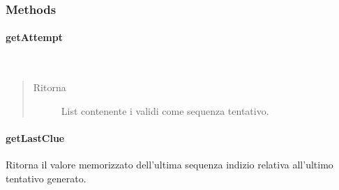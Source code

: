 \documentclass[letterpaper,10pt,italian,openany,oneside]{sphinxmanual}
\begin{document}
\subsubsection{Methods}
\label{\detokenize{source/it/unicam/cs/pa/mastermind/players/CodeBreaker:methods}}

\paragraph{getAttempt}
\label{\detokenize{source/it/unicam/cs/pa/mastermind/players/CodeBreaker:getattempt}}

\begin{fulllineitems}
\label{\detokenize{source/it/unicam/cs/pa/mastermind/players/CodeBreaker:it.unicam.cs.pa.mastermind.players.CodeBreaker.getAttempt()}}~\begin{quote}\begin{description}
\item[{Ritorna}] \leavevmode
List contenente i  validi come sequenza tentativo.

\end{description}\end{quote}

\end{fulllineitems}



\paragraph{getLastClue}
\label{\detokenize{source/it/unicam/cs/pa/mastermind/players/CodeBreaker:getlastclue}}

\begin{fulllineitems}
\label{\detokenize{source/it/unicam/cs/pa/mastermind/players/CodeBreaker:it.unicam.cs.pa.mastermind.players.CodeBreaker.getLastClue()}}
Ritorna il valore memorizzato dell’ultima sequenza indizio relativa all’ultimo tentativo generato.

\end{fulllineitems}
\end{document}
